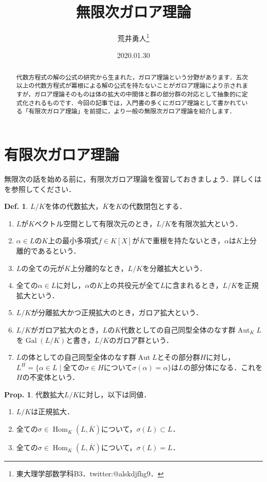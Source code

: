 \documentclass[dvipdfmx,b5paper,papersize]{jsarticle}
\title{無限次ガロア理論}
\author{荒井勇人\footnote{東大理学部数学科B3．twitter:@alskdjfhg9．}}
\date{2020.01.30}
\theoremstyle{definition}
\newtheorem{prop}[thm]{Prop.}
\newtheorem{defi}[thm]{Def.}
\DeclareMathOperator{\Aut}{Aut}
\DeclareMathOperator{\Gal}{Gal}
\DeclareMathOperator{\Hom}{Hom}
\begin{document}
\maketitle

\begin{abstract}
代数方程式の解の公式の研究から生まれた，ガロア理論という分野があります．五次以上の代数方程式が冪根による解の公式を持たないことがガロア理論により示されますが，ガロア理論そのものは体の拡大の中間体と群の部分群の対応として抽象的に定式化されるものです．今回の記事では，入門書の多くにガロア理論として書かれている「有限次ガロア理論」を前提に，より一般の無限次ガロア理論を紹介します．

\end{abstract}



\section{有限次ガロア理論}
無限次の話を始める前に，有限次ガロア理論を復習しておきましょう．詳しくは\cite{雪江}を参照してください．
\begin{defi}
  $L/K$を体の代数拡大，$\overline{K}$を$K$の代数閉包とする．
  \begin{enumerate}
    \item $L$が$K$ベクトル空間として有限次元のとき，$L/K$を有限次拡大という．
    \item $\alpha \in L$の$K$上の最小多項式$f \in K[X]$が$\overline{K}$で重根を持たないとき，$\alpha$は$K$上分離的であるという．
    \item $L$の全ての元が$K$上分離的なとき，$L/K$を分離拡大という．
    \item 全ての$\alpha \in L$に対し，$\alpha$の$K$上の共役元が全て$L$に含まれるとき，$L/K$を正規拡大という．
    \item $L/K$が分離拡大かつ正規拡大のとき，ガロア拡大という．
    \item $L/K$がガロア拡大のとき，$L$の$K$代数としての自己同型全体のなす群$\Aut_K L$を$\Gal(L/K)$と書き，$L/K$のガロア群という．
    \item $L$の体としての自己同型全体のなす群$\Aut L$とその部分群$H$に対し，$L^H=\{\alpha \in L \mid \text{全ての$\sigma \in H$について$\sigma(\alpha)=\alpha$}\}$は$L$の部分体になる．これを$H$の不変体という．

  \end{enumerate}

\end{defi}

\begin{prop}\label{thm:normal}
  代数拡大$L/K$に対し，以下は同値．
  \begin{enumerate}
    \item $L/K$は正規拡大．
    \item 全ての$\sigma \in \Hom_K(L,\overline{K})$について，$\sigma(L) \subset L$．
    \item 全ての$\sigma \in \Hom_K(L,\overline{K})$について，$\sigma(L) = L$．
  \end{enumerate}
\end{prop}
\end{document}
